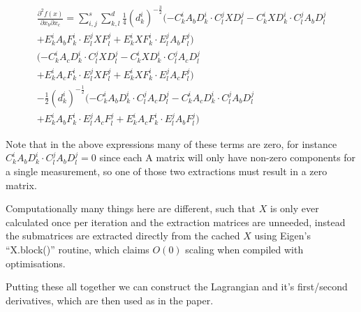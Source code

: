 \documentclass{article}
\begin{document}
\begin{align}
	\frac{\partial^2 f(x)}{\partial x_b \partial x_c} = \sum_{i,j}^s \sum_{k,l}^d \frac{1}{4}(d_k^i)^{-\frac{3}{2}}(-C_k^i A_b D_k^i \cdot C_l^j X D_l^j - C_k^i X D_k^i \cdot C_l^j A_b D_l^j \\
	+ E_k^i A_b F_k^i \cdot E_l^j X F_l^j + E_k^i X F_k^i \cdot E_l^j A_b F_l^j) \\
	(-C_k^i A_c D_k^i \cdot C_l^j X D_l^j - C_k^i X D_k^i \cdot C_l^j A_c D_l^j \\
	+ E_k^i A_c F_k^i \cdot E_l^j X F_l^j + E_k^i X F_k^i \cdot E_l^j A_c F_l^j) \\
	-\frac{1}{2}(d_k^i)^{-\frac{1}{2}}(-C_k^i A_b D_k^i \cdot C_l^j A_c D_l^j - C_k^i A_c D_k^i \cdot C_l^j A_b D_l^j \\
	+ E_k^i A_b F_k^i \cdot E_l^j A_c F_l^j + E_k^i A_c F_k^i \cdot E_l^j A_b F_l^j)
\end{align}

Note that in the above expressions many of these terms are zero, for instance $C_k^i A_b D_k^i \cdot C_l^j A_b D_l^j = 0$ since each A matrix will only have non-zero components for a single measurement, so one of those two extractions must result in a zero matrix.

Computationally many things here are different, such that $X$ is only ever calculated once per iteration and the extraction matrices are unneeded, instead the submatrices are extracted directly from the cached $X$ using Eigen's ``X.block()'' routine, which claims $O(0)$ scaling when compiled with optimisations.

Putting these all together we can construct the Lagrangian and it's first/second derivatives, which are then used as in the paper.
\end{document}

